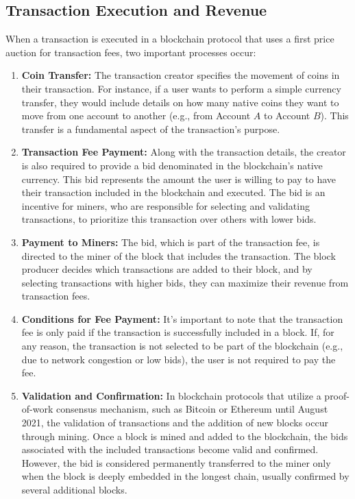 \subsection{Transaction Execution and Revenue}
When a transaction is executed in a blockchain protocol that uses a first price auction for transaction fees, two important processes occur:

\begin{enumerate}
  \item \textbf{Coin Transfer:} The transaction creator specifies the movement of coins in their transaction. For instance, if a user wants to perform a simple currency transfer, they would include details on how many native coins they want to move from one account to another (e.g., from Account $A$ to Account $B$). This transfer is a fundamental aspect of the transaction's purpose.

  \item \textbf{Transaction Fee Payment:} Along with the transaction details, the creator is also required to provide a bid denominated in the blockchain's native currency. This bid represents the amount the user is willing to pay to have their transaction included in the blockchain and executed. The bid is an incentive for miners, who are responsible for selecting and validating transactions, to prioritize this transaction over others with lower bids.

  \item \textbf{Payment to Miners:} The bid, which is part of the transaction fee, is directed to the miner of the block that includes the transaction. The block producer decides which transactions are added to their block, and by selecting transactions with higher bids, they can maximize their revenue from transaction fees.

  \item \textbf{Conditions for Fee Payment:} It's important to note that the transaction fee is only paid if the transaction is successfully included in a block. If, for any reason, the transaction is not selected to be part of the blockchain (e.g., due to network congestion or low bids), the user is not required to pay the fee.

  \item \textbf{Validation and Confirmation:} In blockchain protocols that utilize a proof-of-work consensus mechanism, such as Bitcoin or Ethereum until August 2021, the validation of transactions and the addition of new blocks occur through mining. Once a block is mined and added to the blockchain, the bids associated with the included transactions become valid and confirmed. However, the bid is considered permanently transferred to the miner only when the block is deeply embedded in the longest chain, usually confirmed by several additional blocks.


\end{enumerate}
